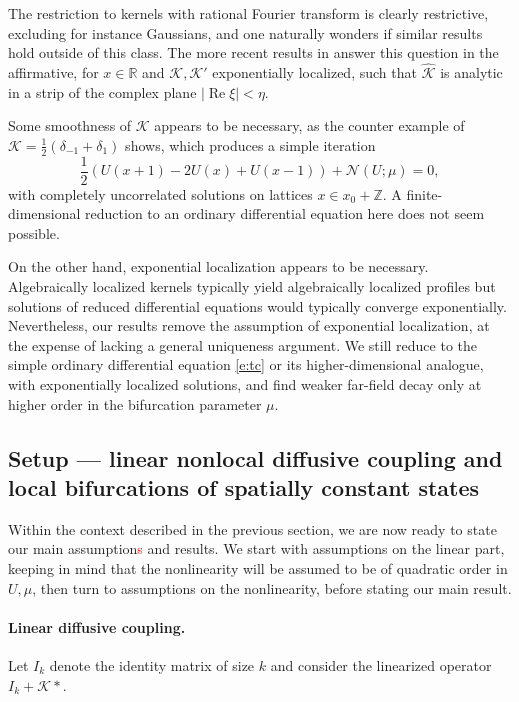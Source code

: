 \documentclass[10pt]{article}
\newcommand{\R}{\mathbb{R}}
\newcommand{\Z}{\mathbb{Z}}
\def\Re{\mathop{\mathrm{Re}}}
\newcommand{\Nl}{\mathcal{N}}
\newcommand{\K}{\mathcal{K}}
\begin{document}
The restriction to kernels with rational Fourier transform is clearly restrictive, excluding for instance Gaussians, and one naturally wonders if similar results hold outside of this class. The more recent results in \cite{FScmfd} answer this question in the affirmative, for $x\in\R$ and $\K,\K'$ exponentially localized, such that $\hat{\K}$ is analytic in a strip of the complex plane $|\Re\xi|<\eta$. 

Some smoothness of $\K$ appears to be necessary, as the counter example of $\K=\frac{1}{2}(\delta_{-1}+\delta_{1})$ shows, which produces a simple iteration 
\[
\frac{1}{2}\left(U(x+1)-2U(x)+U(x-1)\right)+\Nl(U;\mu)=0,
\]
with completely uncorrelated solutions on lattices $x\in x_0+\Z$. A finite-dimensional reduction to an ordinary differential equation here does not seem possible. 

On the other hand, exponential localization appears to be necessary. Algebraically localized kernels typically yield algebraically localized profiles but solutions of reduced differential equations would typically converge exponentially. Nevertheless, our results remove the assumption of exponential localization, at the expense of lacking a general uniqueness argument. We still reduce to the simple ordinary differential equation \eqref{e:tc} or its higher-dimensional analogue, with exponentially localized solutions, and find weaker far-field decay only at higher order in the bifurcation parameter $\mu$.

\subsection{Setup --- linear nonlocal diffusive coupling and local bifurcations of spatially constant states}\label{s:set}
Within the context described in the previous section, we are now ready to state our main assumption\textcolor{red}s and results. We start with assumptions on the linear part, keeping in mind that the nonlinearity will be assumed to be of quadratic order in $U,\mu$, then turn to assumptions on the nonlinearity, before stating our main result. 

\paragraph{Linear diffusive coupling.}

Let $I_k$ denote the identity matrix of size $k$ and consider the linearized operator $I_k + \K*$. 
\end{document}
